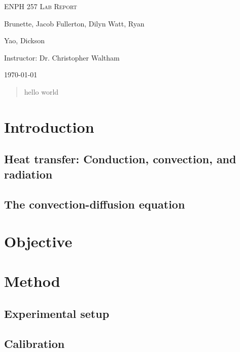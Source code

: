 \documentclass[letterpaper,titlepage,oneside]{report}
\begin{document}
\begin{titlepage}
  \centering
  \vspace*{\fill}
  {\huge\scshape ENPH 257 Lab Report\par}
  \vspace{1cm}
  {\large Brunette, Jacob\quad}
  {\large Fullerton, Dilyn\quad}
  {\large Watt, Ryan\quad}
  {\large Yao, Dickson\par}
  \vspace{1cm}
  {\large Instructor: Dr. Christopher Waltham\par}
  \vspace{1cm}
  {\large \today\par}
  \vspace*{\fill}
  \vfill
\end{titlepage}

\begin{abstract}
  hello world
\end{abstract}

\chapter{Introduction}
\label{ch:intro}

\section{Heat transfer: Conduction, convection, and radiation}

\section{The convection-diffusion equation}

\chapter{Objective}
\label{ch:objective}

\chapter{Method}
\label{ch:method}

\section{Experimental setup}

\section{Calibration}
\end{document}
